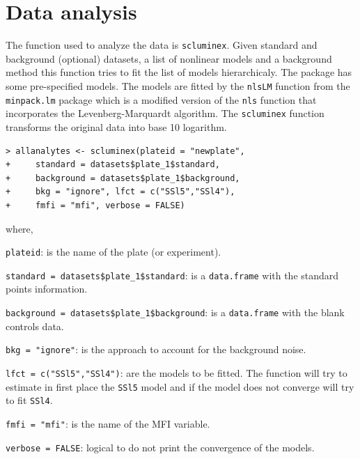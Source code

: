 \documentclass[11pt]{article}\usepackage[]{graphicx}\usepackage[]{color}
\makeatletter
\newenvironment{kframe}{%
 \def\at@end@of@kframe{}%
 \ifinner\ifhmode%
  \def\at@end@of@kframe{\end{minipage}}%
  \begin{minipage}{\columnwidth}%
 \fi\fi%
 \def\FrameCommand##1{\hskip\@totalleftmargin \hskip-\fboxsep
 \colorbox{shadecolor}{##1}\hskip-\fboxsep
     \hskip-\linewidth \hskip-\@totalleftmargin \hskip\columnwidth}%
 \MakeFramed {\advance\hsize-\width
   \@totalleftmargin\z@ \linewidth\hsize
   \@setminipage}}%
 {\par\unskip\endMakeFramed%
 \at@end@of@kframe}
\newenvironment{knitrout}{}{} %
\newenvironment{itemize*}%
    {\begin{itemize}%
        \setlength{\itemsep}{-0.35cm}%
        \setlength{\parskip}{10pt}}%
{\end{itemize}}
\makeatother
\begin{document}

\section{Data analysis}
The function used to analyze the data is {\tt scluminex}. Given standard and 
background (optional) datasets, a list of nonlinear models and a background method this 
function tries to fit the list of models hierarchicaly. The package has some 
pre-specified models. The models are fitted by the {\tt nlsLM} function 
from the {\tt minpack.lm} \cite{minpack.lm} package which is a modified 
version of the {\tt nls} function that incorporates the Levenberg-Marquardt 
algorithm. The {\tt scluminex} function transforms the original data into base 
10 logarithm. 


\begin{knitrout}
\color{fgcolor}\begin{kframe}
\begin{verbatim}
> allanalytes <- scluminex(plateid = "newplate", 
+     standard = datasets$plate_1$standard, 
+     background = datasets$plate_1$background,
+     bkg = "ignore", lfct = c("SSl5","SSl4"), 
+     fmfi = "mfi", verbose = FALSE)
\end{verbatim}
\end{kframe}
\end{knitrout}

\noindent where,

\begin{itemize*}
    \item {\tt plateid}: is the name of the plate (or experiment).
    \item {\tt standard = datasets\$plate\_1\$standard}: is a {\tt data.frame} 
    with the standard points information.
    \item {\tt background = datasets\$plate\_1\$background}: is a {\tt data.frame} 
    with the blank controls data.
    \item {\tt bkg = "ignore"}: is the approach to account for the background noise.
    \item {\tt lfct = c("SSl5","SSl4")}: are the models to be fitted. The function 
    will try to estimate in first place the {\tt SSl5} model and if the model 
    does not converge will try to fit {\tt SSl4}.
    \item {\tt fmfi = "mfi"}: is the name of the MFI variable.
    \item {\tt verbose = FALSE}: logical to do not print the convergence of the models.
\end{itemize*}
\end{document}
